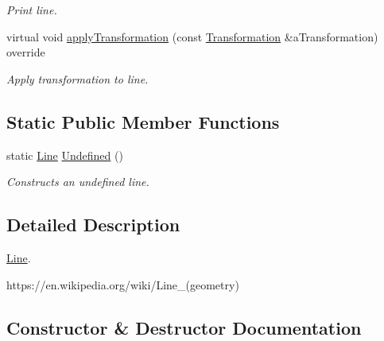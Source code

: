 \begin{DoxyCompactItemize}
\begin{DoxyCompactList}\small\item\em Print line. \end{DoxyCompactList}\item 
virtual void \hyperlink{classlibrary_1_1math_1_1geom_1_1d3_1_1objects_1_1_line_ae485ab541cbd10113eac30d1956fb4c0}{apply\+Transformation} (const \hyperlink{classlibrary_1_1math_1_1geom_1_1d3_1_1_transformation}{Transformation} \&a\+Transformation) override
\begin{DoxyCompactList}\small\item\em Apply transformation to line. \end{DoxyCompactList}\end{DoxyCompactItemize}
\subsection*{Static Public Member Functions}
\begin{DoxyCompactItemize}
\item 
static \hyperlink{classlibrary_1_1math_1_1geom_1_1d3_1_1objects_1_1_line}{Line} \hyperlink{classlibrary_1_1math_1_1geom_1_1d3_1_1objects_1_1_line_a6e80b434196ee84bc74154532989c18c}{Undefined} ()
\begin{DoxyCompactList}\small\item\em Constructs an undefined line. \end{DoxyCompactList}\end{DoxyCompactItemize}


\subsection{Detailed Description}
\hyperlink{classlibrary_1_1math_1_1geom_1_1d3_1_1objects_1_1_line}{Line}. 

https\+://en.wikipedia.\+org/wiki/\+Line\+\_\+(geometry) 

\subsection{Constructor \& Destructor Documentation}
\mbox{\label{classlibrary_1_1math_1_1geom_1_1d3_1_1objects_1_1_line_a762e529453ff9ffa9233fd73737f4692}} 
